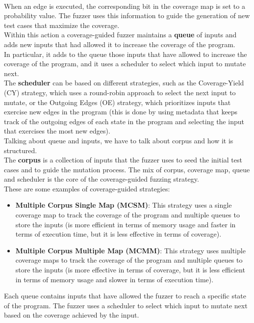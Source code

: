 \phantom{}\\
When an edge is executed, the corresponding bit in the coverage map is set to a probability value. The fuzzer uses this information to guide the generation of new test cases that maximize the coverage.
\\Within this action a coverage-guided fuzzer maintains a \textbf{queue} of inputs and adds new inputs that had allowed it to increase the coverage of the program.
\\In particular, it adds to the queue those inputs that have allowed to increase the coverage of the program, and it uses a scheduler to select which input to mutate next.
\\The \textbf{scheduler} can be based on different strategies, such as the Coverage-Yield (CY) strategy, which uses a round-robin approach to select the next input to mutate, or the Outgoing Edges (OE) strategy, which prioritizes inputs that exercise new edges in the program (this is done by using metadata that keeps track of the outgoing edges of each state in the program and selecting the input that exercises the most new edges).
\\Talking about queue and inputs, we have to talk about corpus and how it is structured.
\\The \textbf{corpus} is a collection of inputs that the fuzzer uses to seed the initial test cases and to guide the mutation process.
The mix of corpus, coverage map, queue and scheduler is the core of the coverage-guided fuzzing strategy.
\\These are some examples of coverage-guided strategies:
\begin{itemize}
    \item \textbf{Multiple Corpus Single Map (MCSM)}: This strategy uses a single coverage map to track the coverage of the program and multiple queues to store the inputs (is more efficient in terms of memory usage and faster in terms of execution time, but it is less effective in terms of coverage).
    
    \item \textbf{Multiple Corpus Multiple Map (MCMM)}: This strategy uses multiple coverage maps to track the coverage of the program and multiple queues to store the inputs (is more effective in terms of coverage, but it is less efficient in terms of memory usage and slower in terms of execution time).
\end{itemize}
Each queue contains inputs that have allowed the fuzzer to reach a specific state of the program. The fuzzer uses a scheduler to select which input to mutate next based on the coverage achieved by the input.


